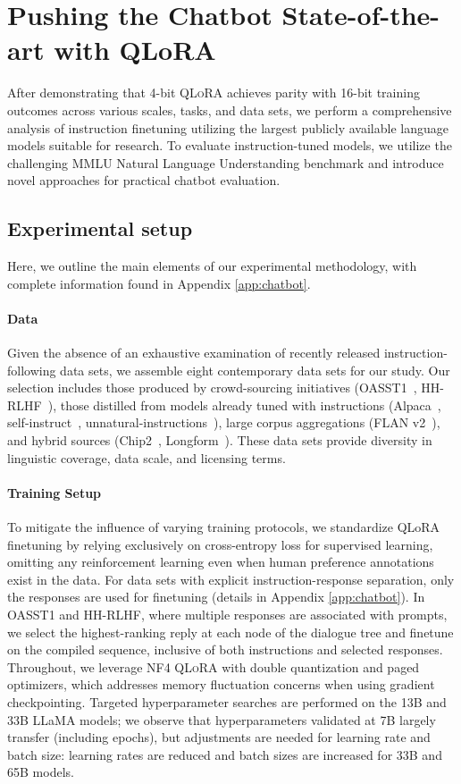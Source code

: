 \section{Pushing the Chatbot State-of-the-art with QLoRA}
\label{sec:pushing}
After demonstrating that 4-bit \textsc{QLoRA} achieves parity with 16-bit training outcomes across various scales, tasks, and data sets, we perform a comprehensive analysis of instruction finetuning utilizing the largest publicly available language models suitable for research. To evaluate instruction-tuned models, we utilize the challenging MMLU Natural Language Understanding benchmark and introduce novel approaches for practical chatbot evaluation.

\subsection{Experimental setup}
Here, we outline the main elements of our experimental methodology, with complete information found in Appendix \ref{app:chatbot}.

\paragraph{Data}
Given the absence of an exhaustive examination of recently released instruction-following data sets, we assemble eight contemporary data sets for our study. Our selection includes those produced by crowd-sourcing initiatives (OASST1~\citep{kopf2023openassistant}, HH-RLHF~\citep{bai2022training}), those distilled from models already tuned with instructions (Alpaca~\citep{alpaca}, self-instruct~\citep{wang2022self}, unnatural-instructions~\citep{honovich2022unnatural}), large corpus aggregations (FLAN v2~\citep{chung2022scaling}), and hybrid sources (Chip2~\citep{laion2023}, Longform~\citep{koksal2023longform}). These data sets provide diversity in linguistic coverage, data scale, and licensing terms.

\paragraph{Training Setup}
To mitigate the influence of varying training protocols, we standardize QLoRA finetuning by relying exclusively on cross-entropy loss for supervised learning, omitting any reinforcement learning even when human preference annotations exist in the data. For data sets with explicit instruction-response separation, only the responses are used for finetuning (details in Appendix \ref{app:chatbot}). In OASST1 and HH-RLHF, where multiple responses are associated with prompts, we select the highest-ranking reply at each node of the dialogue tree and finetune on the compiled sequence, inclusive of both instructions and selected responses. Throughout, we leverage NF4 \textsc{QLoRA} with double quantization and paged optimizers, which addresses memory fluctuation concerns when using gradient checkpointing. Targeted hyperparameter searches are performed on the 13B and 33B LLaMA models; we observe that hyperparameters validated at 7B largely transfer (including epochs), but adjustments are needed for learning rate and batch size: learning rates are reduced and batch sizes are increased for 33B and 65B models.

